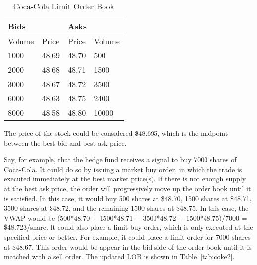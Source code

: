 \begin{table}[htbp]
\caption{Coca-Cola Limit Order Book} \label{tab:coke1}
\begin{center}
\begin{tabular}{ll|ll}
\hline \hline
\multicolumn{2}{l|}{\textbf{Bids}} & \multicolumn{2}{l}{\textbf{Asks}} \\
\hline
Volume           & Price          & Price           & Volume          \\
\hline
1000             & 48.69          & 48.70           & 500             \\
2000             & 48.68          & 48.71           & 1500            \\
3000             & 48.67          & 48.72           & 3500            \\
6000             & 48.63          & 48.75           & 2400            \\
8000             & 48.58          & 48.80           & 10000          
\end{tabular}
\end{center}
\end{table}

The price of the stock could be considered \$48.695, which is the midpoint between the best bid and best ask price. 

Say, for example, that the hedge fund receives a signal to buy 7000 shares of Coca-Cola. It could do so by issuing a market buy order, in which the trade is executed immediately at the best market price(s). If there is not enough supply at the best ask price, the order will progressively move up the order book until it is satisfied. In this case, it would buy 500 shares at \$48.70, 1500 shares at \$48.71, 3500 shares at \$48.72, and the remaining 1500 shares at \$48.75. In this case, the VWAP would be (500*48.70 + 1500*48.71 + 3500*48.72 + 1500*48.75)/7000 = \$48.723/share. It could also place a limit buy order, which is only executed at the specified price or better. For example, it could place a limit order for 7000 shares at \$48.67. This order would be appear in the bid side of the order book until it is matched with a sell order. The updated LOB is shown in Table~\ref{tab:coke2}.

